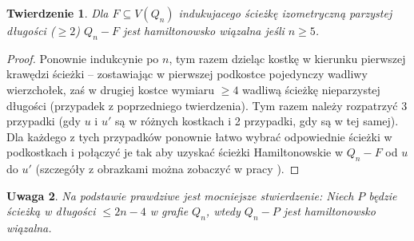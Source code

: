 \documentclass{pracamgr}
\newtheorem{theorem}{Twierdzenie}
\newtheorem{remark}[theorem]{Uwaga}
\begin{document}
    \begin{theorem}\label{hamilton - sciezka, parz}
     Dla $F\subseteq V(Q_n)$ indukujacego ścieżkę izometryczną parzystej długości ($\ge2$) $Q_n-F$ jest hamiltonowsko wiązalna jeśli $n\ge5$.
    \end{theorem}
    \begin{proof}
     Ponownie indukcynie po $n$, tym razem dzieląc kostkę w kierunku pierwszej krawędzi ścieżki -- zostawiając w pierwszej podkostce pojedynczy wadliwy wierzchołek,
     zaś w drugiej kostce wymiaru $\ge4$ wadliwą ścieżkę nieparzystej długości (przypadek z poprzedniego twierdzenia).
     Tym razem należy rozpatrzyć 3 przypadki (gdy $u$ i $u'$ są w różnych kostkach i 2 przypadki, gdy są w tej samej).
     Dla każdego z tych przypadków ponownie łatwo wybrać odpowiednie ścieżki w podkostkach i połączyć je tak aby uzyskać ścieżki Hamiltonowskie w
     $Q_n-F$ od $u$ do $u'$ (szczegóły z obrazkami można zobaczyć w pracy \cite{Pegr}).
    \end{proof}
    \begin{remark}
     Na podstawie \cite{SCJY} prawdziwe jest mocniejsze stwierdzenie:\newline
     Niech $P$ będzie ścieżką w długości $\le 2n-4$ w grafie $Q_n$, wtedy $Q_n-P$ jest hamiltonowsko wiązalna.
    \end{remark}
\end{document}
